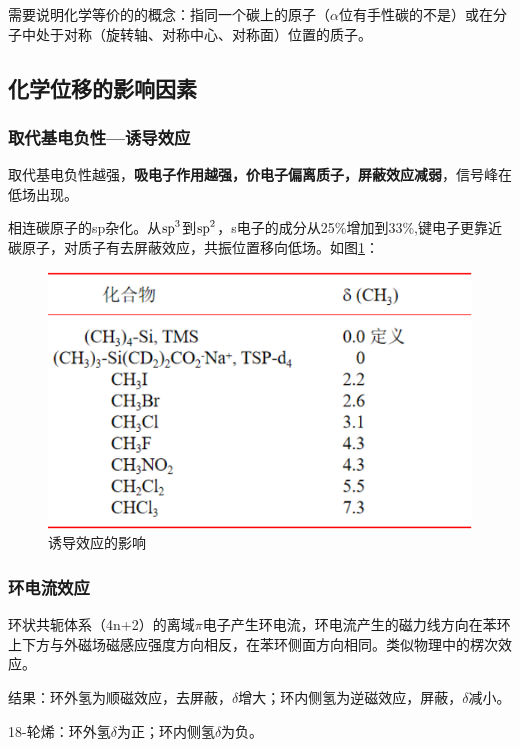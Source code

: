 需要说明化学等价的的概念：指同一个碳上的原子（$\alpha$位有手性碳的不是）或在分子中处于对称（旋转轴、对称中心、对称面）位置的质子。


\subsection{化学位移的影响因素}
\subsubsection{取代基电负性—诱导效应}
取代基电负性越强，\textbf{吸电子作用越强，价电子偏离质子，屏蔽效应减弱}，信号峰在低场出现。

\begin{example}
	相连碳原子的sp杂化。从$\ce{sp^3}$到$\ce{sp^2}$，s电子的成分从25\%增加到33\%,键电子更靠近碳原子，对质子有去屏蔽效应，共振位置移向低场。如图\ref{fig:chp61hnmrx}：
\begin{figure}[!h]
	\centering
	\includegraphics[width=0.5\linewidth]{image/chp6_1HNMR_X}
	\caption{诱导效应的影响}
	\label{fig:chp61hnmrx}
\end{figure}
\end{example}

\subsubsection{环电流效应}
环状共轭体系（4n+2）的离域$\pi$电子产生环电流，环电流产生的磁力线方向在苯环上下方与外磁场磁感应强度方向相反，在苯环侧面方向相同。类似物理中的楞次效应。

结果：环外氢为顺磁效应，去屏蔽，$\delta$增大；环内侧氢为逆磁效应，屏蔽，$\delta$减小。

\begin{example}
18-轮烯：环外氢$\delta$为正；环内侧氢$\delta$为负。

\begin{figure}[!h]
	\centering
	\quad
\end{figure}

\end{example}

